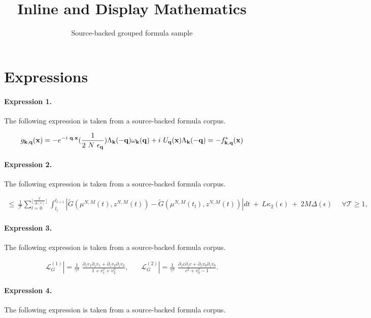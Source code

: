 \documentclass[11pt]{article}
\title{Inline and Display Mathematics}
\author{Source-backed grouped formula sample}
\date{}
\begin{document}
\maketitle
\section{Expressions}
\paragraph{Expression 1.} The following expression is taken from a source-backed formula corpus.

\begin{align*}g_{ {\bf{k}}, {\bf{q}} }({\bf{x}}) = -e^{-i\text{ }{\bf{q.x}} }(\frac{1}{2\text{ }N\text{ }\epsilon_{ {\bf{q}} } })\Lambda_{ {\bf{k}} }(-{\bf{q}})\omega_{ {\bf{k}} }({\bf{q}}) + i\text{ }U_{ {\bf{q}} }({\bf{x}})\Lambda_{ {\bf{k}} }(-{\bf{q}})= -f^{*}_{ {\bf{k}}, {\bf{q}} }({\bf{x}})\end{align*}

\paragraph{Expression 2.} The following expression is taken from a source-backed formula corpus.

\begin{align*}\leq \ \frac{1}{\mathcal{T}}\sum_{l=0}^{\lfloor \frac{\mathcal{T}}{\Delta(\epsilon)} \rfloor}\int_{t_l}^{t_{l+1}}|\tilde G(\mu^{N,M}(t),z^{N,M}(t)) - \tilde G( \mu^{N,M}(t_l), z^{N,M}(t))|dt \ + \ L \kappa_2(\epsilon) \ + \ 2M\Delta(\epsilon) \ \ \ \ \ \ \forall \mathcal{T} \geq 1,\end{align*}

\paragraph{Expression 3.} The following expression is taken from a source-backed formula corpus.

\begin{align*}{\mathcal L}_G^{(1)} |=\frac{1}{\gamma^2}\,\, \frac{\partial_zv_1 \partial_{\bar z}v_1 +\partial_zv_2\partial_{\bar z}v_2}{1+v_1^2 + v_2^2},~~~~~~~~{\mathcal L}_G^{(2)} |=\frac{1}{\gamma^2}\,\, \frac{\partial_zc \partial_{\bar z}c +\partial_zv_0\partial_{\bar z}v_0}{c^2 + v_0^2-1}.\end{align*}

\paragraph{Expression 4.} The following expression is taken from a source-backed formula corpus.
\end{document}
